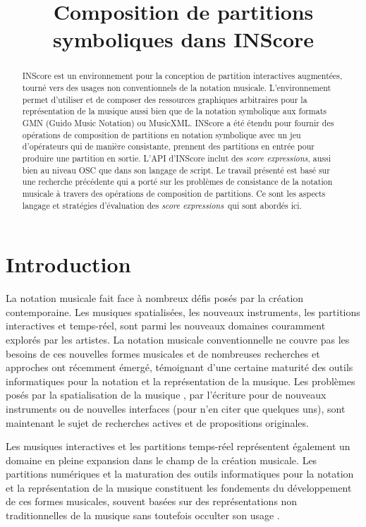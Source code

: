 \documentclass{article}
\title{Composition de partitions symboliques dans INScore}
\newcommand{\sExprs}{\emph{score expressions}}
\begin{document}
%
\maketitle
%
\begin{abstract}
INScore est un environnement pour la conception de partition interactives augmentées, tourné vers des usages non conventionnels de la notation musicale. L'environnement permet d'utiliser et de composer des ressources graphiques arbitraires pour la représentation de la musique aussi bien que de la notation symbolique aux formats GMN (Guido Music Notation) ou MusicXML. INScore a été étendu pour fournir des opérations de composition de partitions en notation symbolique avec un jeu d'opérateurs qui de manière consistante, prennent des partitions en entrée pour produire une partition en sortie. L'API d'INScore inclut des \sExprs , aussi bien au niveau OSC que dans son langage de script. 
Le travail présenté est basé sur une recherche précédente qui a porté sur les problèmes de consistance de la notation musicale à travers des opérations de composition de partitions. Ce sont les aspects langage et stratégies d'évaluation des \sExprs\ qui sont abordés ici.
\end{abstract}

\section{Introduction}\label{sec:introduction}

La notation musicale fait face à nombreux défis posés par la création contemporaine. Les musiques spatialisées, les nouveaux instruments, les partitions interactives et temps-réel, sont parmi les nouveaux domaines couramment explorés par les artistes. 
La notation musicale conventionnelle ne couvre pas les besoins de ces nouvelles formes musicales et de nombreuses recherches et approches ont récemment émergé, témoignant d'une certaine maturité des outils informatiques pour la notation et la représentation de la musique. Les problèmes posés par la spatialisation de la musique \cite{Ellberger_tenor2015}, par l'écriture pour de nouveaux instruments \cite{tmays:2014} ou de nouvelles interfaces  \cite{kschlei:2015} (pour n'en citer que quelques uns), sont maintenant le sujet de recherches actives et de propositions originales.

Les musiques interactives et les partitions temps-réel représentent également un domaine en pleine expansion dans le champ de la création musicale. Les partitions numériques et la maturation des outils informatiques pour la notation et la représentation de la musique constituent les fondements du développement de ces formes musicales, souvent basées sur des représentations non traditionnelles de la musique \cite{RSmith_tenor2015, Hope_tenor2015} sans toutefois occulter son usage \cite{Hoadley12,hoadley14}. 
\end{document}
